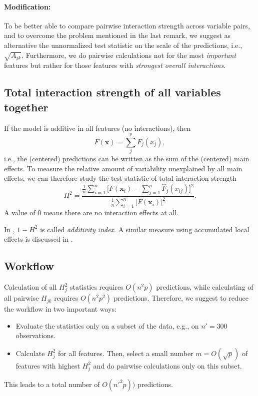 \documentclass[]{article}
\begin{document}
\paragraph{Modification:} To be better able to compare pairwise interaction strength across variable pairs, and to overcome the problem mentioned in the last remark, we suggest as alternative the unnormalized test statistic on the scale of the predictions, i.e., $\sqrt{A_{jk}}$. 
Furthermore, we do pairwise calculations not for the most {\em important} features but rather for those features with {\em strongest overall interactions}.

\subsection{Total interaction strength of all variables together}
If the model is additive in all features (no interactions), then
$$
	F(\mathbf{x}) = \sum_{j}^{p} F_j(x_j),
$$
i.e., the (centered) predictions can be written as the sum of the (centered) main effects.
To measure the relative amount of variability unexplained by all main effects, we can therefore study the test statistic of total interaction strength
$$
  H^2 = \frac{\frac{1}{n} \sum_{i = 1}^n \big[F(\mathbf{x}_i) - \sum_{j = 1}^p\hat F_j(x_{ij})\big]^2}{\frac{1}{n} \sum_{i = 1}^n\big[F(\mathbf{x}_i)\big]^2}.
$$
A value of 0 means there are no interaction effects at all. 

In \cite{zolkowski2023}, $1 - H^2$ is called {\em additivity index}. A similar measure using accumulated local effects is discussed in \cite{molnar2020}.

\subsection{Workflow}
Calculation of all $H_j^2$ statistics requires $O(n^2p)$ predictions, while calculating of all pairwise $H_{jk}$ requires $O(n^2 p^2)$ predictions. Therefore, we suggest to reduce the workflow in two important ways:
\begin{itemize}
\item Evaluate the statistics only on a subset of the data, e.g., on $n' = 300$ observations.
\item Calculate $H_j^2$ for all features. Then, select a small number $m = O(\sqrt{p})$ of features with highest $H^2_j$ and do pairwise calculations only on this subset.
\end{itemize}
This leads to a total number of $O(n'^2 p))$ predictions.
\end{document}
